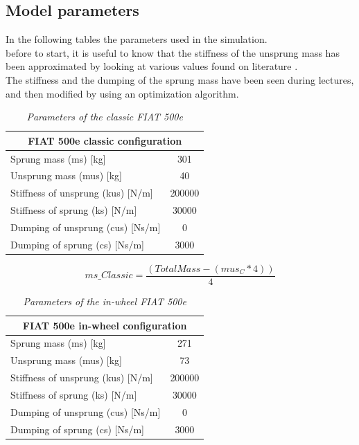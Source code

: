 \documentclass{article}
\numberwithin{equation}{section}
\numberwithin{figure}{section}
\numberwithin{table}{section}
\numberwithin{table}{section}
\begin{document}
\subsection{Model parameters}
In the following tables the parameters used in the simulation.\\
before to start, it is useful to know that the stiffness of the unsprung mass has been approximated by looking at various values found on literature \cite{article_stiffnes_tire}.\\
The stiffness and the dumping of the sprung mass have been seen during lectures, and then modified by using an optimization algorithm. 
\begin{table}[H]
\centering
\begin{tabular}{|l|c|}
\hline
\multicolumn{2}{|c|}{\textbf{FIAT 500e classic configuration}} \\ \hline
Sprung mass (ms) {[}kg{]}                     & 301            \\ \hline
Unsprung mass (mus) {[}kg{]}                  & 40             \\ \hline
Stiffness of unsprung (kus) {[}N/m{]}         & 200000         \\ \hline
Stiffness of sprung (ks) {[}N/m{]}            & 30000          \\ \hline
Dumping of unsprung (cus) {[}Ns/m{]}          & 0              \\ \hline
Dumping of sprung (cs) {[}Ns/m{]}             & 3000           \\ \hline
\end{tabular}\caption{\emph{Parameters of the classic FIAT 500e}}
\end{table}

\begin{equation}
    ms\_Classic=\frac{(TotalMass-(mus_C*4))}{4}
\end{equation}

\begin{table}[H]
\centering
\begin{tabular}{|l|c|}
\hline
\multicolumn{2}{|c|}{\textbf{FIAT 500e in-wheel configuration}} \\ \hline
Sprung mass (ms) {[}kg{]}                     & 271            \\ \hline
Unsprung mass (mus) {[}kg{]}                  & 73             \\ \hline
Stiffness of unsprung (kus) {[}N/m{]}         & 200000         \\ \hline
Stiffness of sprung (ks) {[}N/m{]}            & 30000          \\ \hline
Dumping of unsprung (cus) {[}Ns/m{]}          & 0              \\ \hline
Dumping of sprung (cs) {[}Ns/m{]}             & 3000           \\ \hline
\end{tabular}\caption{\emph{Parameters of the in-wheel FIAT 500e}}
\end{table}
\end{document}
